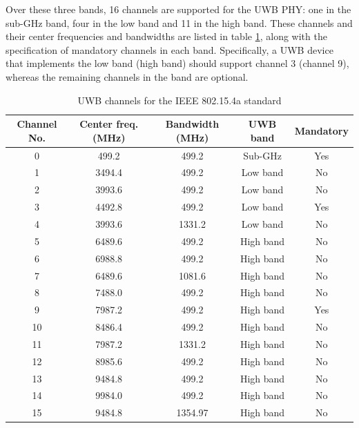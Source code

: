 \documentclass[\main/main.tex]{subfiles}
\begin{document}
Over these three bands, 16 channels are supported for the UWB PHY: one in the sub-GHz band, four in the low band and 11 in the high band. These channels and their center frequencies and bandwidths are listed in table \ref{tab:uwb_channels_for_the_IEEE_802_15_4a_standard}, along with the specification of mandatory channels in each band. Specifically, a UWB device that implements the low band (high band) should support channel 3 (channel 9), whereas the remaining channels in the band are optional.

\begin{table}[H]
    \centering
    \begin{tabular}{ |c|c|c|c|c| } 
        \hline
        Channel No. & Center freq. (MHz) & Bandwidth (MHz) & UWB band & Mandatory \\\hline
        0& 499.2& 499.2& Sub-GHz& Yes \\\hline
        1& 3494.4& 499.2& Low band& No \\\hline
        2& 3993.6& 499.2& Low band& No \\\hline
        3& 4492.8& 499.2& Low band& Yes \\\hline
        4& 3993.6& 1331.2& Low band& No \\\hline
        5& 6489.6& 499.2& High band& No \\\hline
        6& 6988.8& 499.2& High band& No \\\hline
        7& 6489.6& 1081.6& High band& No \\\hline
        8& 7488.0& 499.2& High band& No \\\hline
        9& 7987.2& 499.2& High band& Yes \\\hline
        10& 8486.4& 499.2& High band& No \\\hline
        11& 7987.2& 1331.2& High band& No \\\hline
        12& 8985.6& 499.2& High band& No \\\hline
        13& 9484.8& 499.2& High band& No \\\hline
        14& 9984.0& 499.2& High band& No \\\hline
        15& 9484.8& 1354.97& High band& No \\\hline
    \end{tabular}
    \caption{UWB channels for the IEEE 802.15.4a standard}
    \label{tab:uwb_channels_for_the_IEEE_802_15_4a_standard}
\end{table}

\bib
\end{document}
